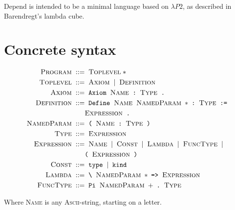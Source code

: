 \documentclass{article}
\newcommand{\nt}[1]{\;\textsc{#1}\;}
\newcommand{\tm}[1]{\;\texttt{#1}\;}
\begin{document}
Depend is intended to be a minimal language based on
$\lambda{}P2$, as described in Barendregt's lambda cube.

\section{Concrete syntax}
\begin{align*}
    \nt{Program} &::= \nt{Toplevel} *  \\
    \nt{Toplevel} &::= \nt{Axiom} \mid \nt{Definition} \\
    \nt{Axiom} &::= \tm{Axiom} \nt{Name} \tm{:} \nt{Type} \tm{.} \\
    \nt{Definition} &::= \tm{Define} \nt{Name}
                         \nt{NamedParam}* \tm{:}
                         \nt{Type} \tm{:=} \\
                    &\phantom{::=} \nt{Expression} \tm{.} \\
    \nt{NamedParam} &::= \tm{(} \nt{Name} \tm{:} \nt{Type} \tm{)} \\
    \nt{Type} &::= \nt{Expression} \\
    \nt{Expression} &::= \nt{Name} \mid \nt{Const} \mid \nt{Lambda} \mid \nt{FuncType} \mid\\
                    &\phantom{::=} \tm{(} \nt{Expression} \tm{)} \\
    \nt{Const} &::= \tm{type} \mid \tm{kind} \\
    \nt{Lambda} &::= \tm{\textbackslash} \nt{NamedParam}* \tm{=>} \nt{Expression} \\
    \nt{FuncType} &::= \tm{Pi} \nt{NamedParam}+ \tm{.} \nt{Type}
\end{align*}

Where \nt{Name} is any \textsc{Ascii}-string, starting on a letter.
\end{document}
